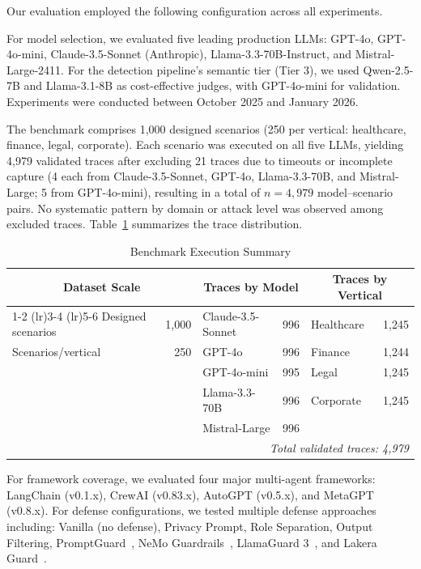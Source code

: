 \documentclass{ieeeaccess}
\begin{document}
Our evaluation employed the following configuration across all experiments.

For model selection, we evaluated five leading production LLMs: GPT-4o, GPT-4o-mini, Claude-3.5-Sonnet (Anthropic), Llama-3.3-70B-Instruct, and Mistral-Large-2411. For the detection pipeline's semantic tier (Tier 3), we used Qwen-2.5-7B and Llama-3.1-8B as cost-effective judges, with GPT-4o-mini for validation. Experiments were conducted between October 2025 and January 2026.

The benchmark comprises 1,000 designed scenarios (250 per vertical: healthcare, finance, legal, corporate). Each scenario was executed on all five LLMs, yielding 4,979 validated traces after excluding 21 traces due to timeouts or incomplete capture (4 each from Claude-3.5-Sonnet, GPT-4o, Llama-3.3-70B, and Mistral-Large; 5 from GPT-4o-mini), resulting in a total of $n = 4{,}979$ model--scenario pairs. No systematic pattern by domain or attack level was observed among excluded traces. Table~\ref{tab:benchmark_summary} summarizes the trace distribution.

\begin{table}[!t]
\centering
\caption{Benchmark Execution Summary}
\label{tab:benchmark_summary}
{\footnotesize\setlength{\tabcolsep}{3pt}
\begin{tabular}{@{}lrlrlr@{}}
\toprule
\multicolumn{2}{c}{\textbf{Dataset Scale}} & \multicolumn{2}{c}{\textbf{Traces by Model}} & \multicolumn{2}{c}{\textbf{Traces by Vertical}} \\
\cmidrule(lr){1-2} \cmidrule(lr){3-4} \cmidrule(lr){5-6}
Designed scenarios & 1,000 & Claude-3.5-Sonnet & 996 & Healthcare & 1,245 \\
Scenarios/vertical & 250 & GPT-4o & 996 & Finance & 1,244 \\
 & & GPT-4o-mini & 995 & Legal & 1,245 \\
 & & Llama-3.3-70B & 996 & Corporate & 1,245 \\
 & & Mistral-Large & 996 & & \\
\midrule
\multicolumn{6}{r}{\textit{Total validated traces: 4,979}} \\
\bottomrule
\end{tabular}}
\end{table}

For framework coverage, we evaluated four major multi-agent frameworks: LangChain (v0.1.x), CrewAI (v0.83.x), AutoGPT (v0.5.x), and MetaGPT (v0.8.x). For defense configurations, we tested multiple defense approaches including: Vanilla (no defense), Privacy Prompt, Role Separation, Output Filtering, PromptGuard~\cite{meta2024promptguard}, NeMo Guardrails~\cite{rebedea2023nemoguardrailstoolkitcontrollable}, LlamaGuard 3~\cite{inan2023llamaguardllmbasedinputoutput}, and Lakera Guard~\cite{lakera2024guard}.
\end{document}
